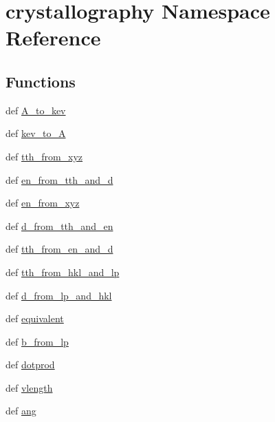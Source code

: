 \hypertarget{namespacecrystallography}{\section{crystallography Namespace Reference}
\label{namespacecrystallography}
}
\subsection*{Functions}
\begin{DoxyCompactItemize}
\item 
def \hyperlink{namespacecrystallography_a58171b4824c6f98df0d2200bc258bde2}{A\-\_\-to\-\_\-kev}
\item 
def \hyperlink{namespacecrystallography_a20e6dff641c1326b0062aabcd924cffd}{kev\-\_\-to\-\_\-\-A}
\item 
def \hyperlink{namespacecrystallography_ae86fb13e8f363baa1b13639483c01183}{tth\-\_\-from\-\_\-xyz}
\item 
def \hyperlink{namespacecrystallography_a9efa98c3b1aef1d7beca6fb89086c388}{en\-\_\-from\-\_\-tth\-\_\-and\-\_\-d}
\item 
def \hyperlink{namespacecrystallography_af940a609cdeb81c339448daa1db7c9a9}{en\-\_\-from\-\_\-xyz}
\item 
def \hyperlink{namespacecrystallography_a4df51e2fddc4a9c843028a572a645d8a}{d\-\_\-from\-\_\-tth\-\_\-and\-\_\-en}
\item 
def \hyperlink{namespacecrystallography_aa131e8fb34e0833ceaff1dcdf8337a60}{tth\-\_\-from\-\_\-en\-\_\-and\-\_\-d}
\item 
def \hyperlink{namespacecrystallography_a797dc74ad0fe257371737f35f5bf44d8}{tth\-\_\-from\-\_\-hkl\-\_\-and\-\_\-lp}
\item 
def \hyperlink{namespacecrystallography_a5f7e74ec1d11c8cfb020d7ebb515c0c5}{d\-\_\-from\-\_\-lp\-\_\-and\-\_\-hkl}
\item 
def \hyperlink{namespacecrystallography_a0c041a7a2849ec884fe8bd234b7e04dd}{equivalent}
\item 
def \hyperlink{namespacecrystallography_a1b5cfcfc56bb0c43e2898b18c2ae0f31}{b\-\_\-from\-\_\-lp}
\item 
def \hyperlink{namespacecrystallography_a108a8b1c5312871f58ebcbe980b37801}{dotprod}
\item 
def \hyperlink{namespacecrystallography_aea2c4d89da7b6b57a4d947a51ed67c9e}{vlength}
\item 
def \hyperlink{namespacecrystallography_aae60d18338e58a21bb9abd24beecbe42}{ang}

\end{DoxyCompactItemize}
